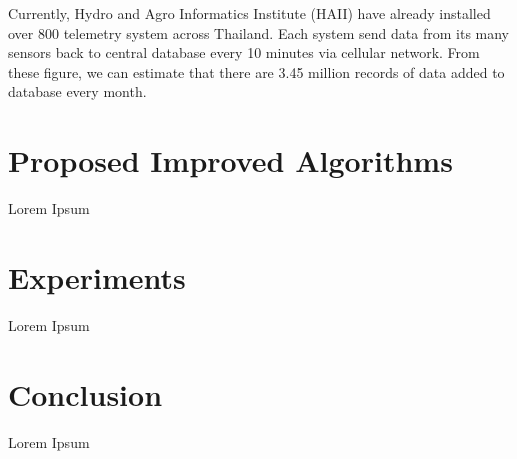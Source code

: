 \documentclass[conference]{IEEEtran}
\begin{document}
Currently, Hydro and Agro Informatics Institute (HAII) have already installed over 800 telemetry system across Thailand. Each system send data from its many sensors back to central database every 10 minutes via cellular network. From these figure, we can estimate that there are 3.45 million records of data added to database every month.

\section{Proposed Improved Algorithms}

Lorem Ipsum

\section{Experiments}

Lorem Ipsum

\section{Conclusion}

Lorem Ipsum

\end{document}
